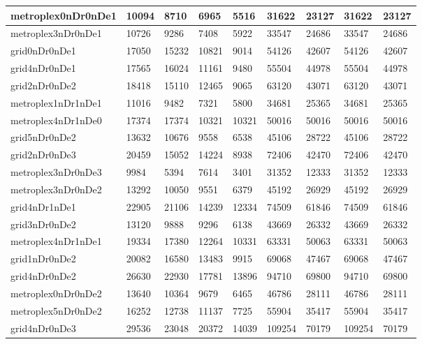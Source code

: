 \documentclass[../thesis.tex]{subfiles}
\begin{document}
\begin{table}[!ht]
\begin{tabular}{|l|l|l|l|l|l|l|l|l|}
        metroplex0nDr0nDe1 & 10094 & 8710 & 6965 & 5516 & 31622 & 23127 & 31622 & 23127 \\ \hline
        metroplex3nDr0nDe1 & 10726 & 9286 & 7408 & 5922 & 33547 & 24686 & 33547 & 24686 \\ \hline
        grid0nDr0nDe1 & 17050 & 15232 & 10821 & 9014 & 54126 & 42607 & 54126 & 42607 \\ \hline
        grid4nDr0nDe1 & 17565 & 16024 & 11161 & 9480 & 55504 & 44978 & 55504 & 44978 \\ \hline
        grid2nDr0nDe2 & 18418 & 15110 & 12465 & 9065 & 63120 & 43071 & 63120 & 43071 \\ \hline
        metroplex1nDr1nDe1 & 11016 & 9482 & 7321 & 5800 & 34681 & 25365 & 34681 & 25365 \\ \hline
        metroplex4nDr1nDe0 & 17374 & 17374 & 10321 & 10321 & 50016 & 50016 & 50016 & 50016 \\ \hline
        grid5nDr0nDe2 & 13632 & 10676 & 9558 & 6538 & 45106 & 28722 & 45106 & 28722 \\ \hline
        grid2nDr0nDe3 & 20459 & 15052 & 14224 & 8938 & 72406 & 42470 & 72406 & 42470 \\ \hline
        metroplex3nDr0nDe3 & 9984 & 5394 & 7614 & 3401 & 31352 & 12333 & 31352 & 12333 \\ \hline
        metroplex3nDr0nDe2 & 13292 & 10050 & 9551 & 6379 & 45192 & 26929 & 45192 & 26929 \\ \hline
        grid4nDr1nDe1 & 22905 & 21106 & 14239 & 12334 & 74509 & 61846 & 74509 & 61846 \\ \hline
        grid3nDr0nDe2 & 13120 & 9888 & 9296 & 6138 & 43669 & 26332 & 43669 & 26332 \\ \hline
        metroplex4nDr1nDe1 & 19334 & 17380 & 12264 & 10331 & 63331 & 50063 & 63331 & 50063 \\ \hline
        grid1nDr0nDe2 & 20082 & 16580 & 13483 & 9915 & 69068 & 47467 & 69068 & 47467 \\ \hline
        grid4nDr0nDe2 & 26630 & 22930 & 17781 & 13896 & 94710 & 69800 & 94710 & 69800 \\ \hline
        metroplex0nDr0nDe2 & 13640 & 10364 & 9679 & 6465 & 46786 & 28111 & 46786 & 28111 \\ \hline
        metroplex5nDr0nDe2 & 16252 & 12738 & 11137 & 7725 & 55904 & 35417 & 55904 & 35417 \\ \hline
        grid4nDr0nDe3 & 29536 & 23048 & 20372 & 14039 & 109254 & 70179 & 109254 & 70179 \\ \hline

\end{tabular}
\end{table}
\end{document}
